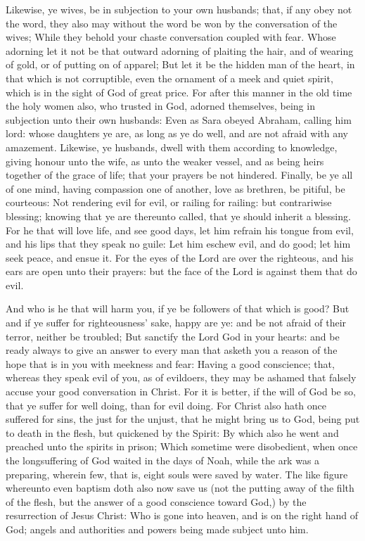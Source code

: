  Likewise, ye wives, be in subjection to your own
husbands; that, if any obey not the word, they also may without the word
be won by the conversation of the wives;  While they
behold your chaste conversation coupled with fear.  Whose
adorning let it not be that outward adorning of plaiting the hair, and
of wearing of gold, or of putting on of apparel;  But let
it be the hidden man of the heart, in that which is not corruptible,
even the ornament of a meek and quiet spirit, which is in the sight of
God of great price.  For after this manner in the old time
the holy women also, who trusted in God, adorned themselves, being in
subjection unto their own husbands:  Even as Sara obeyed
Abraham, calling him lord: whose daughters ye are, as long as ye do
well, and are not afraid with any amazement.  Likewise, ye
husbands, dwell with them according to knowledge, giving honour unto the
wife, as unto the weaker vessel, and as being heirs together of the
grace of life; that your prayers be not hindered. 
Finally, be ye all of one mind, having compassion one of another, love
as brethren, be pitiful, be courteous:  Not rendering evil
for evil, or railing for railing: but contrariwise blessing; knowing
that ye are thereunto called, that ye should inherit a blessing.
 For he that will love life, and see good days, let him
refrain his tongue from evil, and his lips that they speak no guile:
 Let him eschew evil, and do good; let him seek peace,
and ensue it.  For the eyes of the Lord are over the
righteous, and his ears are open unto their prayers: but the face of the
Lord is against them that do evil.

 And who is he that will harm you, if ye be followers of
that which is good?  But and if ye suffer for
righteousness' sake, happy are ye: and be not afraid of their terror,
neither be troubled;  But sanctify the Lord God in your
hearts: and be ready always to give an answer to every man that asketh
you a reason of the hope that is in you with meekness and fear:
 Having a good conscience; that, whereas they speak evil
of you, as of evildoers, they may be ashamed that falsely accuse your
good conversation in Christ.  For it is better, if the
will of God be so, that ye suffer for well doing, than for evil doing.
 For Christ also hath once suffered for sins, the just
for the unjust, that he might bring us to God, being put to death in the
flesh, but quickened by the Spirit:  By which also he
went and preached unto the spirits in prison;  Which
sometime were disobedient, when once the longsuffering of God waited in
the days of Noah, while the ark was a preparing, wherein few, that is,
eight souls were saved by water.  The like figure
whereunto even baptism doth also now save us (not the putting away of
the filth of the flesh, but the answer of a good conscience toward God,)
by the resurrection of Jesus Christ:  Who is gone into
heaven, and is on the right hand of God; angels and authorities and
powers being made subject unto him.

